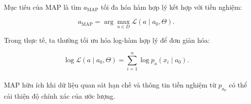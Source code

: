 \paragraph{}{Mục tiêu của MAP là tìm $a_{\text{MAP}}$ tối đa hóa hàm hợp lý kết hợp với tiền nghiệm:

\[
a_{\text{MAP}} = \arg\max_{a \in D} \mathcal{L}(a \mid a_0, \Theta).
\]

Trong thực tế, ta thường tối ưu hóa log-hàm hợp lý để đơn giản hóa:

\[
\log \mathcal{L}(a \mid a_0, \Theta) = \sum_{i=1}^n \log p_a(x_i \mid a_0).
\]
}

\paragraph{}{MAP hữu ích khi dữ liệu quan sát hạn chế và thông tin tiền nghiệm từ $p_{a_0}$ có thể cải thiện độ chính xác của ước lượng.}

